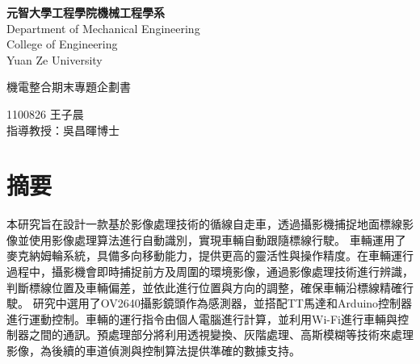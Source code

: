 \documentclass[12pt]{article}       %
\begin{document}
\begin{titlepage}
    \centering
    \vspace*{1cm} %

    {\LARGE \textbf{元智大學工程學院機械工程學系}} \\[0.5cm] %
    {\LARGE {Department of Mechanical Engineering}} \\[0.5cm] %
    {\LARGE {College of Engineering}} \\[0.5cm]
    {\LARGE {Yuan Ze University}}

    \vfill %

    {\LARGE{機電整合期末專題企劃書}} %

    \vfill %

    {\LARGE {1100826 王子晨}}\\[6cm]
    {\LARGE {指導教授：吳昌暉\hspace{0.5cm}博士}}\\[0.5cm]

\end{titlepage}
\newpage

\setcounter{page}{1}  %


\section*{\centering 摘要}  %


\hspace{2em}本研究旨在設計一款基於影像處理技術的循線自走車，透過攝影機捕捉地面標線影像並使用影像處理算法進行自動識別，實現車輛自動跟隨標線行駛。
車輛運用了麥克納姆輪系統，具備多向移動能力，提供更高的靈活性與操作精度。在車輛運行過程中，攝影機會即時捕捉前方及周圍的環境影像，通過影像處理技術進行辨識，判斷標線位置及車輛偏差，並依此進行位置與方向的調整，確保車輛沿標線精確行駛。
研究中選用了OV2640攝影鏡頭作為感測器，並搭配TT馬達和Arduino控制器進行運動控制。車輛的運行指令由個人電腦進行計算，並利用Wi-Fi進行車輛與控制器之間的通訊。預處理部分將利用透視變換、灰階處理、高斯模糊等技術來處理影像，為後續的車道偵測與控制算法提供準確的數據支持。
\end{document}
